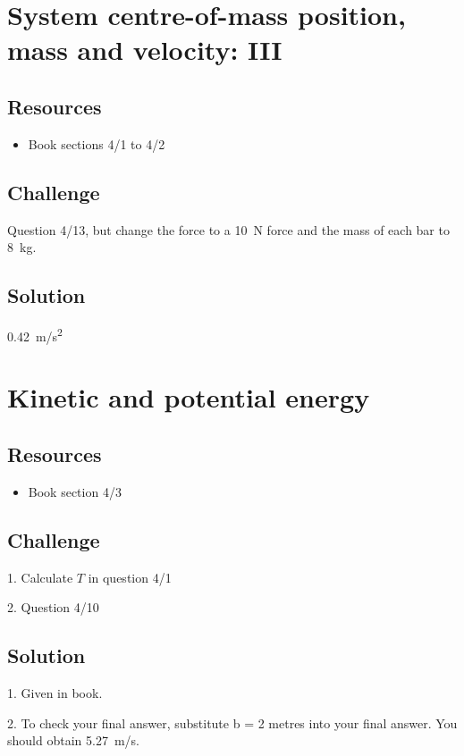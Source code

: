 \newpage
\section{System centre-of-mass position, mass and velocity: III}

\subsection*{Resources}
\begin{itemize}
    \item Book sections 4/1 to 4/2
\end{itemize}

\subsection*{Challenge}
Question 4/13, but change the force to a \SI{10}{N} force and the mass of each bar to \SI{8}{kg}.

\subsection*{Solution}
\SI{0.42}{m/s^2}




\newpage
\section{Kinetic and potential energy}

\subsection*{Resources}
\begin{itemize}
    \item Book section 4/3
\end{itemize}

\subsection*{Challenge}
1. Calculate $T$ in question 4/1

2. Question 4/10

\subsection*{Solution}
1. Given in book.

2. To check your final answer, substitute b = 2 metres into your final answer. You should obtain \SI{5.27}{m/s}.




